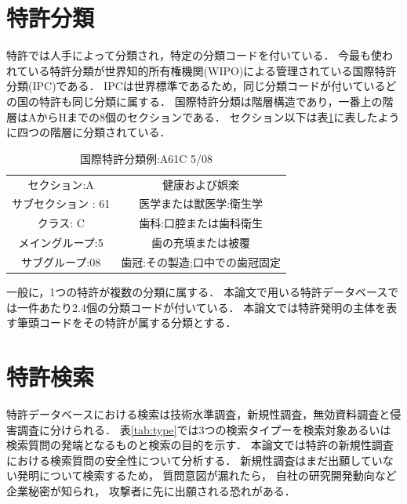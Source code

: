 \documentclass[master]{suribt}
\theoremstyle{definition}
\begin{document}
 \section{特許分類}
 特許では人手によって分類され，特定の分類コードを付いている．
 今最も使われている特許分類が世界知的所有権機関(WIPO)による管理されている国際特許分類(IPC)である．
 IPCは世界標準であるため，同じ分類コードが付いているどの国の特許も同じ分類に属する．
 国際特許分類は階層構造であり，一番上の階層はAからHまでの8個のセクションである．
 セクション以下は表\ref{tab:IPC}に表したように四つの階層に分類されている．
 
 \begin{table}[!hbp]
 \center
 \begin{tabular}{cc}
    セクション:A & 健康および娯楽 \\
    サブセクション : 61 & 医学または獣医学:衛生学 \\
    クラス: C & 歯科:口腔または歯科衛生 \\
    メイングループ:5 & 歯の充填または被覆 \\
    サブグループ:08 & 歯冠:その製造;口中での歯冠固定 \\
 \end{tabular}
 \caption{国際特許分類例:A61C 5/08}
 \label{tab:IPC}
 \end{table}
 
 一般に，1つの特許が複数の分類に属する．
 本論文で用いる特許データベースでは一件あたり2.4個の分類コードが付いている．
 本論文では特許発明の主体を表す筆頭コードをその特許が属する分類とする．
 
 \section{特許検索}
 特許データベースにおける検索は技術水準調査，新規性調査，無効資料調査と侵害調査に分けられる．
 表\ref{tab:type}では3つの検索タイプーを検索対象あるいは検索質問の発端となるものと検索の目的を示す．
 本論文では特許の新規性調査における検索質問の安全性について分析する．
 新規性調査はまだ出願していない発明について検索するため，
 質問意図が漏れたら，
 自社の研究開発動向など企業秘密が知られ，
 攻撃者に先に出願される恐れがある．
 
\end{document}
